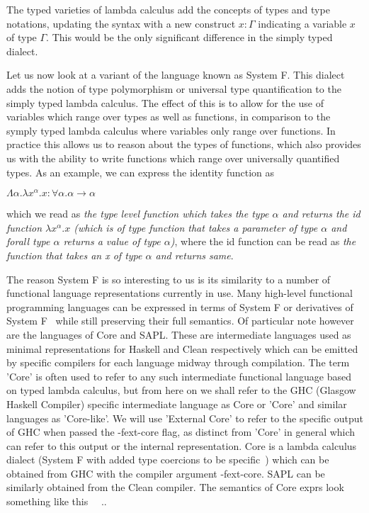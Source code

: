 \noindent The typed varieties of lambda calculus add the concepts of types and type
notations, updating the syntax with a new construct \(x:\Gamma \) indicating
a variable \(x\) of type \(\Gamma\). This would be the only significant 
difference in the simply typed dialect. 

Let us now look at a variant of the language known as System F. This dialect
adds the notion of type polymorphism or universal type quantification to 
the simply typed lambda calculus. The effect of this is to allow for the
use of variables which range over types as well as functions, in comparison
to the symply typed lambda calculus where variables only range over functions.
In practice this allows us to reason about the types of functions, which also
provides us with the ability to write functions which range over universally
quantified types. As an example, we can express the identity function as

\begin{center}
 \( \Lambda \alpha . \lambda x^\alpha . x : \forall \alpha . \alpha \rightarrow \alpha  \)
\end{center}

\noindent which we read as \emph{the type level function which takes 
the type \(\alpha\) and returns the id function \( \lambda x^\alpha . x \)
(which is of type \emph{ function that takes a parameter of type \( \alpha \) 
and forall type \(\alpha\) returns a value of type \( \alpha \)})}, where 
the id function can be read as \emph{the function that takes an x of 
type \( \alpha \) and returns same}. 

The reason System F is so interesting to us is its similarity to a number of functional
language representations currently in use. Many high-level functional programming languages
can be expressed in terms of System F or derivatives of System F~\cite{SystemF} while still 
preserving their full semantics. Of
particular note however are the languages of Core and SAPL. These are intermediate languages
used as minimal representations for Haskell and Clean respectively which can be emitted by
specific compilers for each language midway through compilation. The term 'Core' is often
used to refer to any such intermediate functional language based on typed lambda calculus,
but from here on we shall refer to the GHC (Glasgow Haskell Compiler) specific intermediate
language as Core or 'Core' and similar languages as 'Core-like'. We will use 'External 
Core' to refer to the specific output of GHC when passed the -fext-core flag, as distinct
from 'Core' in general which can refer to this output or the internal representation. 
Core is a lambda calculus dialect (System F with added type coercions to be 
specific~\cite{Ext-Core}) which can be obtained from GHC with the compiler argument 
-fext-core. SAPL can be similarly obtained from the Clean compiler.  The semantics of 
Core exprs look something like this
~\cite{GHCCoreSyntax}~\cite[pp.9]{Inliner}..

